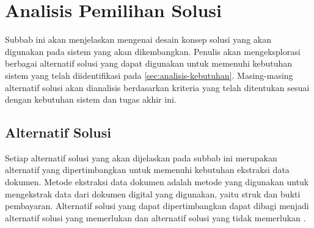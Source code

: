 \section{Analisis Pemilihan Solusi}
\label{sec:analisis-pemilihan-solusi}

Subbab ini akan menjelaskan mengenai desain konsep solusi yang akan digunakan pada sistem yang akan dikembangkan. Penulis akan mengeksplorasi berbagai alternatif solusi yang dapat digunakan untuk memenuhi kebutuhan sistem yang telah diidentifikasi pada \autoref{sec:analisis-kebutuhan}. Masing-masing alternatif solusi akan dianalisis berdasarkan kriteria yang telah ditentukan sesuai dengan kebutuhan sistem dan tugas akhir ini.

\subsection{Alternatif Solusi}
\label{subsec:alternatif-solusi}
Setiap alternatif solusi yang akan dijelaskan pada subbab ini merupakan alternatif yang dipertimbangkan untuk memenuhi kebutuhan ekstraksi data dokumen. Metode ekstraksi data dokumen adalah metode yang digunakan untuk mengekstrak data dari dokumen digital yang digunakan, yaitu struk dan bukti pembayaran. Alternatif solusi yang dapat dipertimbangkan dapat dibagi menjadi alternatif solusi yang memerlukan \ocr{} dan alternatif solusi yang tidak memerlukan \ocr. 

